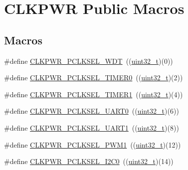 \hypertarget{group___c_l_k_p_w_r___public___macros}{}\section{C\+L\+K\+P\+WR Public Macros}
\label{group___c_l_k_p_w_r___public___macros}
\subsection*{Macros}
\begin{DoxyCompactItemize}
\item 
\#define \hyperlink{group___c_l_k_p_w_r___public___macros_ga336ff9ef63221ddb5d2306637434b988}{C\+L\+K\+P\+W\+R\+\_\+\+P\+C\+L\+K\+S\+E\+L\+\_\+\+W\+DT}~((\hyperlink{_p_e___types_8h_a33594304e786b158f3fb30289278f5af}{uint32\+\_\+t})(0))
\item 
\#define \hyperlink{group___c_l_k_p_w_r___public___macros_gab1acc813f04ade492704686390180d0e}{C\+L\+K\+P\+W\+R\+\_\+\+P\+C\+L\+K\+S\+E\+L\+\_\+\+T\+I\+M\+E\+R0}~((\hyperlink{_p_e___types_8h_a33594304e786b158f3fb30289278f5af}{uint32\+\_\+t})(2))
\item 
\#define \hyperlink{group___c_l_k_p_w_r___public___macros_ga6f40e91e37d638a7005abc64f0f339f7}{C\+L\+K\+P\+W\+R\+\_\+\+P\+C\+L\+K\+S\+E\+L\+\_\+\+T\+I\+M\+E\+R1}~((\hyperlink{_p_e___types_8h_a33594304e786b158f3fb30289278f5af}{uint32\+\_\+t})(4))
\item 
\#define \hyperlink{group___c_l_k_p_w_r___public___macros_gab55e1cb2751a05bac54292939ce3937b}{C\+L\+K\+P\+W\+R\+\_\+\+P\+C\+L\+K\+S\+E\+L\+\_\+\+U\+A\+R\+T0}~((\hyperlink{_p_e___types_8h_a33594304e786b158f3fb30289278f5af}{uint32\+\_\+t})(6))
\item 
\#define \hyperlink{group___c_l_k_p_w_r___public___macros_ga1e565a2eb1621b007b3f11725637474d}{C\+L\+K\+P\+W\+R\+\_\+\+P\+C\+L\+K\+S\+E\+L\+\_\+\+U\+A\+R\+T1}~((\hyperlink{_p_e___types_8h_a33594304e786b158f3fb30289278f5af}{uint32\+\_\+t})(8))
\item 
\#define \hyperlink{group___c_l_k_p_w_r___public___macros_ga2ce2c973644d4ddfcc6651d4d2665492}{C\+L\+K\+P\+W\+R\+\_\+\+P\+C\+L\+K\+S\+E\+L\+\_\+\+P\+W\+M1}~((\hyperlink{_p_e___types_8h_a33594304e786b158f3fb30289278f5af}{uint32\+\_\+t})(12))
\item 
\#define \hyperlink{group___c_l_k_p_w_r___public___macros_ga43fd50253c56be7a7fd2f93cd2684078}{C\+L\+K\+P\+W\+R\+\_\+\+P\+C\+L\+K\+S\+E\+L\+\_\+\+I2\+C0}~((\hyperlink{_p_e___types_8h_a33594304e786b158f3fb30289278f5af}{uint32\+\_\+t})(14))

\end{DoxyCompactItemize}
